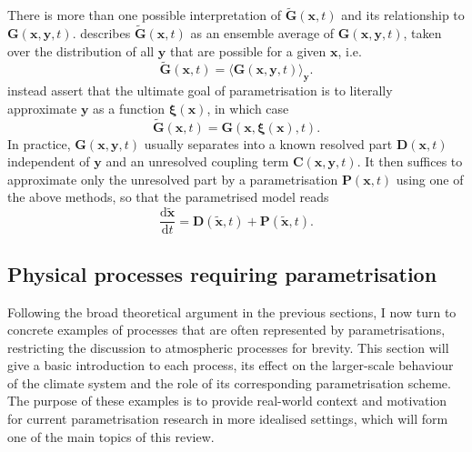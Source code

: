 \documentclass[titlepage,twoside]{article}
\numberwithin{equation}{section}
\newcommand{\diff}[2]{\frac{\mathrm{d} #1}{\mathrm{d} #2}}
\renewcommand\vec{\bm}
\begin{document}
There is more than one possible interpretation of $\tilde{\vec{G}}(\vec{x},t)$
and its relationship to $\vec{G}(\vec{x},\vec{y},t)$. \textcite{hasselmann1976}
describes $\tilde{\vec{G}}(\vec{x},t)$ as an ensemble average of
$\vec{G}(\vec{x},\vec{y},t)$, taken over the distribution of all $\vec{y}$ that
are possible for a given $\vec{x}$, i.e.
\begin{equation*}
    \tilde{\vec{G}}(\vec{x},t)
        = \langle \vec{G}(\vec{x},\vec{y},t) \rangle_{\vec{y}}.
\end{equation*}
\textcite{demaeyer2018} instead assert that the ultimate goal of
parametrisation is to literally approximate $\vec{y}$ as a function
$\vec{\xi}(\vec{x})$, in which case
\begin{equation*}
    \tilde{\vec{G}}(\vec{x},t)
        = \vec{G}(\vec{x},\vec{\xi}(\vec{x}),t).
\end{equation*}
In practice, $\vec{G}(\vec{x},\vec{y},t)$ usually separates into a known
resolved part $\vec{D}(\vec{x},t)$ independent of $\vec{y}$ and an unresolved
coupling term $\vec{C}(\vec{x},\vec{y},t)$. It then suffices to approximate
only the unresolved part by a parametrisation $\vec{P}(\vec{x}, t)$ using one
of the above methods, so that the parametrised model reads
\begin{equation} \label{eqn:parametrised_model}
    \diff{\tilde{\vec{x}}}{t}
        = \vec{D}(\tilde{\vec{x}},t) + \vec{P}(\tilde{\vec{x}}, t).
\end{equation}


\subsection{Physical processes requiring parametrisation}
Following the broad theoretical argument in the previous sections, I now turn
to concrete examples of processes that are often represented by
parametrisations, restricting the discussion to atmospheric processes for
brevity. This section will give a basic introduction to each process, its
effect on the larger-scale behaviour of the climate system and the role of its
corresponding parametrisation scheme. The purpose of these examples is to
provide real-world context and motivation for current parametrisation research
in more idealised settings, which will form one of the main topics of this
review.
\end{document}
